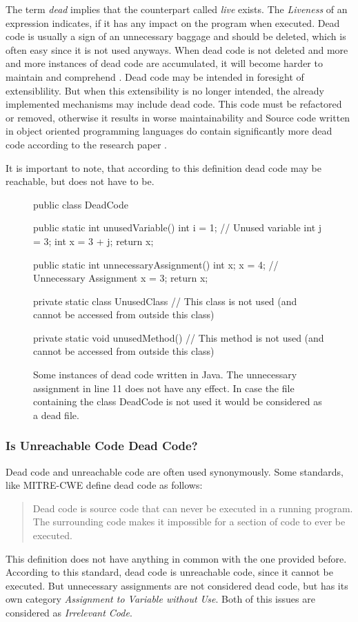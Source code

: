 The term \emph{dead} implies that the counterpart called \emph{live} exists. 
The \emph{Liveness} of an expression indicates, if it has any impact on the program when executed.
Dead code is usually a sign of an unnecessary baggage and should be deleted, which is often easy since it is not used anyways.
When dead code is not deleted and more and more instances of dead code are accumulated, it will become harder to maintain and comprehend \cite{Romano_2020}. Dead code may be intended in foresight of extensiblility. But when this extensibility is no longer intended, the already implemented mechanisms may include dead code. This code must be refactored or removed, otherwise it results in worse maintainability and 
Source code written in object oriented programming languages do contain significantly more dead code according to the research paper \cite{Srivastava_1992}.


It is important to note, that according to this definition dead code may be reachable, but does not have to be.



\begin{figure}
	\begin{JavaCode}
public class DeadCode {
	public static int unusedVariable() {
		int i = 1; // Unused variable
		int j = 3;
		int x = 3 + j;
		return x;
	}
			
	public static int unnecessaryAssignment() {
		int x;
		x = 4; // Unnecessary Assignment
		x = 3;
		return x;
	}
			
	private static class UnusedClass {
		// This class is not used (and cannot be accessed from outside this class)
	}
			
	private static void unusedMethod() {
		// This method is not used (and cannot be accessed from outside this class)
	}
}\end{JavaCode}
	\caption{Some instances of dead code written in Java. The unnecessary assignment in line 11 does not have any effect. In case the file containing the class DeadCode is not used it would be considered as a dead file.}
	\label{code:dead code}
\end{figure}

\subsubsection{Is Unreachable Code Dead Code?}
Dead code and unreachable code are often used synonymously. 
Some standards, like MITRE-CWE \cite{CWECWE561Dead} define dead code as follows:
\begin{quote}
	Dead code is source code that can never be executed in a running program. The surrounding code makes it impossible for a section of code to ever be executed.
\end{quote}
This definition does not have anything in common with the one provided before. According to this standard, dead code is unreachable code, since it cannot be executed. But unnecessary assignments are not considered dead code, but has its own category \emph{Assignment to Variable without Use}.
Both of this issues are considered as \emph{Irrelevant Code}.


